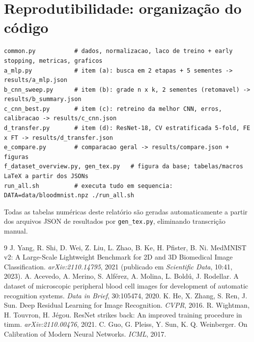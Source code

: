 \documentclass[10pt,a4paper]{article}
\begin{document}


\section{Reprodutibilidade: organização do código}
\begin{lstlisting}
common.py           # dados, normalizacao, laco de treino + early stopping, metricas, graficos
a_mlp.py            # item (a): busca em 2 etapas + 5 sementes -> results/a_mlp.json
b_cnn_sweep.py      # item (b): grade n x k, 2 sementes (retomavel) -> results/b_summary.json
c_cnn_best.py       # item (c): retreino da melhor CNN, erros, calibracao -> results/c_cnn.json
d_transfer.py       # item (d): ResNet-18, CV estratificada 5-fold, FE x FT -> results/d_transfer.json
e_compare.py        # comparacao geral -> results/compare.json + figuras
f_dataset_overview.py, gen_tex.py   # figura da base; tabelas/macros LaTeX a partir dos JSONs
run_all.sh          # executa tudo em sequencia:  DATA=data/bloodmnist.npz ./run_all.sh
\end{lstlisting}
Todas as tabelas numéricas deste relatório são geradas automaticamente a partir dos arquivos JSON de
resultados por \texttt{gen\_tex.py}, eliminando transcrição manual.

\begin{thebibliography}{9}\small
{} J. Yang, R. Shi, D. Wei, Z. Liu, L. Zhao, B. Ke, H. Pfister, B. Ni. MedMNIST v2: A
Large-Scale Lightweight Benchmark for 2D and 3D Biomedical Image Classification. \emph{arXiv:2110.14795}, 2021
(publicado em \emph{Scientific Data}, 10:41, 2023).
 A. Acevedo, A. Merino, S. Alférez, A. Molina, L. Boldú, J. Rodellar. A dataset of
microscopic peripheral blood cell images for development of automatic recognition systems. \emph{Data in Brief},
30:105474, 2020.
 K. He, X. Zhang, S. Ren, J. Sun. Deep Residual Learning for Image Recognition. \emph{CVPR}, 2016.
 R. Wightman, H. Touvron, H. Jégou. ResNet strikes back: An improved training procedure in
timm. \emph{arXiv:2110.00476}, 2021.
 C. Guo, G. Pleiss, Y. Sun, K. Q. Weinberger. On Calibration of Modern Neural Networks.
\emph{ICML}, 2017.
\end{thebibliography}
\end{document}
